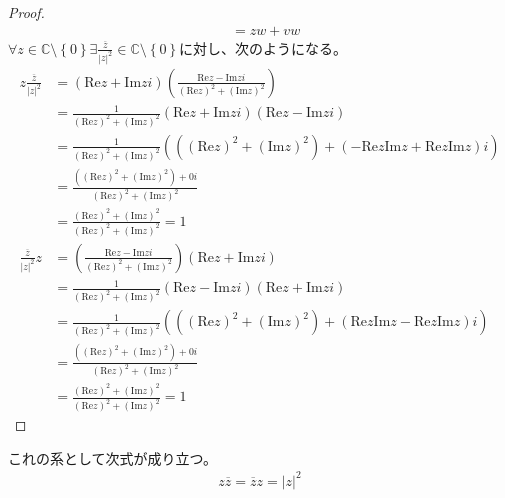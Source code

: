 \documentclass[dvipdfmx]{jsarticle}
\begin{document}
\begin{proof}
\begin{align*}
&= zw + vw
\end{align*}
$\forall z \in \mathbb{C} \setminus \left\{ 0 \right\}\exists\frac{\overline{z}}{|z|^{2}} \in \mathbb{C} \setminus \left\{ 0 \right\}$に対し、次のようになる。
\begin{align*}
z\frac{\overline{z}}{|z|^{2}} &= \left( \mathrm{Re}z + \mathrm{Im}zi \right)\left( \frac{\mathrm{Re}z - \mathrm{Im}zi}{\left( \mathrm{Re}z \right)^{2} + \left( \mathrm{Im}z \right)^{2}} \right)\\
&= \frac{1}{\left( \mathrm{Re}z \right)^{2} + \left( \mathrm{Im}z \right)^{2}}\left( \mathrm{Re}z + \mathrm{Im}zi \right)\left( \mathrm{Re}z - \mathrm{Im}zi \right)\\
&= \frac{1}{\left( \mathrm{Re}z \right)^{2} + \left( \mathrm{Im}z \right)^{2}}\left( \left( \left( \mathrm{Re}z \right)^{2} + \left( \mathrm{Im}z \right)^{2} \right) + \left( - \mathrm{Re}z\mathrm{Im}z + \mathrm{Re}z\mathrm{Im}z \right)i \right)\\
&= \frac{\left( \left( \mathrm{Re}z \right)^{2} + \left( \mathrm{Im}z \right)^{2} \right) + 0i}{\left( \mathrm{Re}z \right)^{2} + \left( \mathrm{Im}z \right)^{2}}\\
&= \frac{\left( \mathrm{Re}z \right)^{2} + \left( \mathrm{Im}z \right)^{2}}{\left( \mathrm{Re}z \right)^{2} + \left( \mathrm{Im}z \right)^{2}} = 1\\
\frac{\overline{z}}{|z|^{2}}z &= \left( \frac{\mathrm{Re}z - \mathrm{Im}zi}{\left( \mathrm{Re}z \right)^{2} + \left( \mathrm{Im}z \right)^{2}} \right)\left( \mathrm{Re}z + \mathrm{Im}zi \right)\\
&= \frac{1}{\left( \mathrm{Re}z \right)^{2} + \left( \mathrm{Im}z \right)^{2}}\left( \mathrm{Re}z - \mathrm{Im}zi \right)\left( \mathrm{Re}z + \mathrm{Im}zi \right)\\
&= \frac{1}{\left( \mathrm{Re}z \right)^{2} + \left( \mathrm{Im}z \right)^{2}}\left( \left( \left( \mathrm{Re}z \right)^{2} + \left( \mathrm{Im}z \right)^{2} \right) + \left( \mathrm{Re}z\mathrm{Im}z - \mathrm{Re}z\mathrm{Im}z \right)i \right)\\
&= \frac{\left( \left( \mathrm{Re}z \right)^{2} + \left( \mathrm{Im}z \right)^{2} \right) + 0i}{\left( \mathrm{Re}z \right)^{2} + \left( \mathrm{Im}z \right)^{2}}\\
&= \frac{\left( \mathrm{Re}z \right)^{2} + \left( \mathrm{Im}z \right)^{2}}{\left( \mathrm{Re}z \right)^{2} + \left( \mathrm{Im}z \right)^{2}} = 1
\end{align*}
\end{proof}
\begin{thm}\label{4.1.2.10} これの系として次式が成り立つ。
\begin{align*}
z\overline{z} = \overline{z}z = |z|^{2}
\end{align*}
\end{thm}
\end{document}
